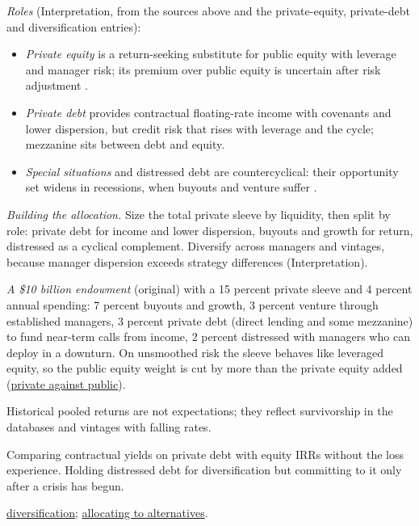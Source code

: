 \begin{qfmethod}
\emph{Roles} (Interpretation, from the sources above and the private-equity, private-debt and diversification entries):
\begin{itemize}
\item \emph{Private equity} is a return-seeking substitute for public equity with leverage and manager risk; its premium over public equity is uncertain after risk adjustment \citep[pp.~427--428]{s7-ang}.
\item \emph{Private debt} provides contractual floating-rate income with covenants and lower dispersion, but credit risk that rises with leverage and the cycle; mezzanine sits between debt and equity.
\item \emph{Special situations} and distressed debt are countercyclical: their opportunity set widens in recessions, when buyouts and venture suffer \citep[p.~163]{demaria-private-markets-2021}.
\end{itemize}

\emph{Building the allocation.} Size the total private sleeve by liquidity, then split by role: private debt for income and lower dispersion, buyouts and growth for return, distressed as a cyclical complement. Diversify across managers and vintages, because manager dispersion exceeds strategy differences (Interpretation).

 \emph{A \$10 billion endowment} (original) with a 15 percent private sleeve and 4 percent annual spending: 7 percent buyouts and growth, 3 percent venture through established managers, 3 percent private debt (direct lending and some mezzanine) to fund near-term calls from income, 2 percent distressed with managers who can deploy in a downturn. On unsmoothed risk the sleeve behaves like leveraged equity, so the public equity weight is cut by more than the private equity added (\hyperref[meth:private-public-market-comparison]{private against public}).

 Historical pooled returns are not expectations; they reflect survivorship in the databases and vintages with falling rates.

 Comparing contractual yields on private debt with equity IRRs without the loss experience. Holding distressed debt for diversification but committing to it only after a crisis has begun.

 \hyperref[meth:private-capital-diversification]{diversification}; \hyperref[meth:alternatives-allocation-approaches]{allocating to alternatives}.

\end{qfmethod}
